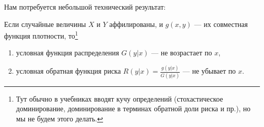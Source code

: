 Нам потребуется небольшой технический результат:
\begin{myth}
Если случайные величины $ X $ и $ Y $ аффилированы, и $ g(x,y) $ — их совместная функция плотности, то\footnote{Тут обычно в учебниках вводят кучу определений (стохастическое доминирование, доминирование в терминах обратной доли риска и пр.), но мы не будем этого делать.}
\begin{enumerate}
\item условная функция распределения $ G(y|x)$ — не возрастает по $ x $,
\item условная обратная функция риска  $ R(y|x)=\frac{g(y|x)}{G(y|x)} $ — не убывает по $ x $.
\end{enumerate}
\end{myth}
